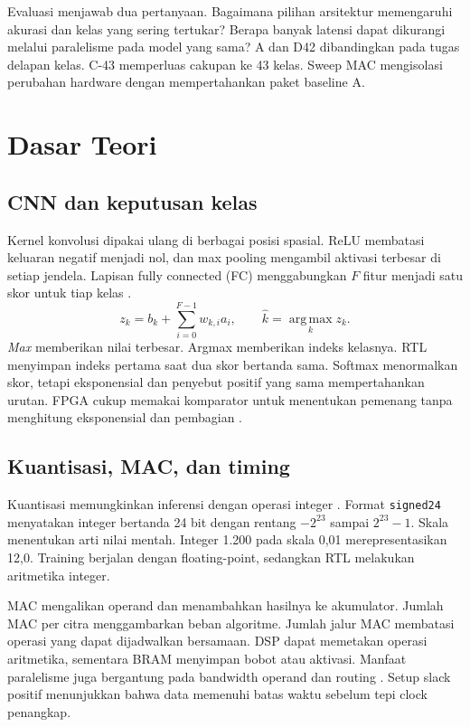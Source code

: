 \documentclass[11pt,a4paper]{article}
\begin{document}
Evaluasi menjawab dua pertanyaan. Bagaimana pilihan arsitektur memengaruhi
akurasi dan kelas yang sering tertukar? Berapa banyak latensi dapat
dikurangi melalui paralelisme pada model yang sama? A dan D42 dibandingkan
pada tugas delapan kelas. C-43 memperluas cakupan ke 43 kelas. Sweep MAC
mengisolasi perubahan hardware dengan mempertahankan paket baseline A.

\section{Dasar Teori}
\subsection{CNN dan keputusan kelas}
Kernel konvolusi dipakai ulang di berbagai posisi spasial. ReLU
membatasi keluaran negatif menjadi nol, dan max pooling mengambil
aktivasi terbesar di setiap jendela. Lapisan fully connected (FC)
menggabungkan \(F\) fitur menjadi satu skor untuk tiap kelas
\cite{goodfellow}.
\[
 z_k=b_k+\sum_{i=0}^{F-1}w_{k,i}a_i,\qquad
 \hat{k}=\operatorname*{arg\,max}_k z_k.
\]
\textit{Max} memberikan nilai terbesar. Argmax memberikan indeks kelasnya.
RTL menyimpan indeks pertama saat dua skor bertanda sama. Softmax
menormalkan skor, tetapi eksponensial dan penyebut positif yang sama
mempertahankan urutan. FPGA cukup memakai komparator untuk menentukan
pemenang tanpa menghitung eksponensial dan pembagian
\cite{goodfellow}.

\subsection{Kuantisasi, MAC, dan timing}
Kuantisasi memungkinkan inferensi dengan operasi integer
\cite{jacob}. Format \texttt{signed24} menyatakan integer bertanda 24 bit
dengan rentang \(-2^{23}\) sampai \(2^{23}-1\). Skala menentukan arti
nilai mentah. Integer 1.200 pada skala 0,01 merepresentasikan 12,0.
Training berjalan dengan floating-point, sedangkan RTL melakukan
aritmetika integer.

MAC mengalikan operand dan menambahkan hasilnya ke akumulator.
Jumlah MAC per citra menggambarkan beban algoritme. Jumlah jalur MAC
membatasi operasi yang dapat dijadwalkan bersamaan. DSP dapat memetakan
operasi aritmetika, sementara BRAM menyimpan bobot atau aktivasi.
Manfaat paralelisme juga bergantung pada bandwidth operand dan routing
\cite{sze}. Setup slack positif menunjukkan bahwa data memenuhi batas
waktu sebelum tepi clock penangkap.
\end{document}
